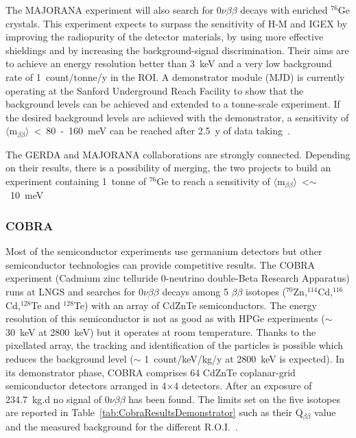 \documentclass[main.tex]{subfiles}
\begin{document}
The MAJORANA experiment will also search for 0$\nu\beta\beta$ decays with enriched $^{\text{76}}$Ge crystals. This experiment expects to surpass the sensitivity of H-M and IGEX by improving the radiopurity of the detector materials, by using more effective shieldings and by increasing the background-signal discrimination. Their aims are to achieve an energy resolution better than 3~keV and a very low background rate of 1~count/tonne/y in the ROI. A demonstrator module (MJD) is currently operating at the Sanford Underground Reach Facility to show that the background levels can be achieved and extended to a tonne-scale experiment. If the desired background levels are achieved with the demonstrator, a sensitivity of $\langle \text{m}_{\beta\beta} \rangle$~<~80~-~160~meV can be reached after 2.5~y of data taking~\cite{MAJORANA}.


\bigskip


\NI The GERDA and MAJORANA collaborations are strongly connected. Depending on their results, there is a possibility of merging, the two projects to build an experiment containing 1~tonne of $^{\text{76}}$Ge to reach a sensitivity of $\langle \text{m}_{\beta\beta} \rangle$~<$\sim$~10~meV~\cite{MAJORANAandGERDA} \\

\subsubsection{COBRA}


\NI Most of the semiconductor experiments use germanium detectors but other semiconductor technologies can provide competitive results. The COBRA experiment (Cadmium zinc telluride 0-neutrino double-Beta Research Apparatus) runs at LNGS and searches for 0$\nu\beta\beta$ decays among 5 $\beta\beta$ isotopes ($^{\text{70}}$Zn,$^{\text{114}}$Cd,$^{\text{116}}$Cd,$^{\text{128}}$Te and $^{\text{128}}$Te) with an array of CdZnTe semiconductors. The energy resolution of this semiconductor is not as good as with HPGe experiments ($\sim$ 30~keV at 2800~keV) but it operates at room temperature. Thanks to the pixellated array, the tracking and identification of the particles is possible which reduces the background level ($\sim$ 1~count/keV/kg/y at 2800~keV is expected). In its demonstrator phase, COBRA comprises 64 CdZnTe coplanar-grid semiconductor detectors arranged in 4$\times$4 detectors. After an exposure of 234.7~kg.d no signal of 0$\nu\beta\beta$ has been found. The limits set on the five isotopes are reported in Table~\ref{tab:CobraResultsDemonstrator} such as their Q$_{\beta\beta}$ value and the measured background for the different R.O.I.~\cite{CobraDemonstrator}.
\end{document}

